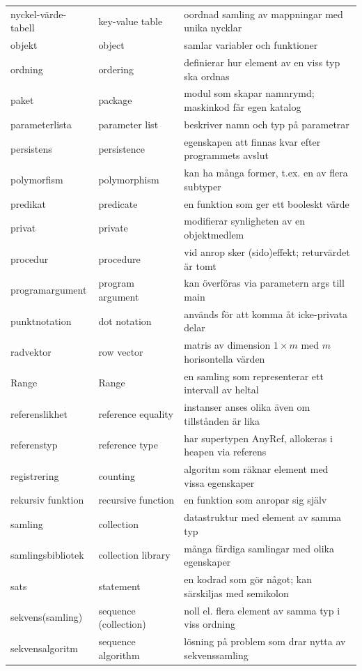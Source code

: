 \begin{tabular}{l|l|l}
nyckel-värde-tabell & key-value table & oordnad samling av mappningar med unika nycklar \\
objekt & object & samlar variabler och funktioner \\
ordning & ordering & definierar hur element av en viss typ ska ordnas \\
paket & package & modul som skapar namnrymd; maskinkod får egen katalog \\
parameterlista & parameter list & beskriver namn och typ på parametrar \\
persistens & persistence & egenskapen att finnas kvar efter programmets avslut \\
polymorfism & polymorphism & kan ha många former, t.ex. en av flera subtyper \\
predikat & predicate & en funktion som ger ett booleskt värde \\
privat & private & modifierar synligheten av en objektmedlem \\
procedur & procedure & vid anrop sker (sido)effekt; returvärdet är tomt \\
programargument & program argument & kan överföras via parametern args till main \\
punktnotation & dot notation & används för att komma åt icke-privata delar \\
radvektor & row vector & matris av dimension $1\times{}m$ med $m$ horisontella värden \\
Range & Range & en samling som representerar ett intervall av heltal \\
referenslikhet & reference equality & instanser anses olika även om tillstånden är lika \\
referenstyp & reference type & har supertypen AnyRef, allokeras i heapen via referens \\
registrering & counting & algoritm som räknar element med vissa egenskaper \\
rekursiv funktion & recursive function & en funktion som anropar sig själv \\
samling & collection & datastruktur med element av samma typ \\
samlingsbibliotek & collection library & många färdiga samlingar med olika egenskaper \\
sats & statement & en kodrad som gör något; kan särskiljas med semikolon \\
sekvens(samling) & sequence (collection) & noll el. flera element av samma typ i viss ordning \\
sekvensalgoritm & sequence algorithm & lösning på problem som drar nytta av sekvenssamling \\

\end{tabular}
